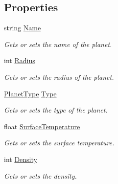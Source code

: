 \subsection*{Properties}
\begin{DoxyCompactItemize}
\item 
string \hyperlink{class_midnight_blue_1_1_planet_metadata_a7afda7361d57bbbf9bb9d6be47167149}{Name}
\begin{DoxyCompactList}\small\item\em Gets or sets the name of the planet. \end{DoxyCompactList}\item 
int \hyperlink{class_midnight_blue_1_1_planet_metadata_a2aa80bee630ca09d10ab12c7734e1ea4}{Radius}
\begin{DoxyCompactList}\small\item\em Gets or sets the radius of the planet. \end{DoxyCompactList}\item 
\hyperlink{namespace_midnight_blue_a4a799009a18b57979628708589ae53e3}{Planet\+Type} \hyperlink{class_midnight_blue_1_1_planet_metadata_a9d8ec38e5924a68970df4795c6185971}{Type}
\begin{DoxyCompactList}\small\item\em Gets or sets the type of the planet. \end{DoxyCompactList}\item 
float \hyperlink{class_midnight_blue_1_1_planet_metadata_a6902b9cd6ac9400696c6aaa74a52821f}{Surface\+Temperature}
\begin{DoxyCompactList}\small\item\em Gets or sets the surface temperature. \end{DoxyCompactList}\item 
int \hyperlink{class_midnight_blue_1_1_planet_metadata_a6f3fe53543f04e24f107c6464b03d885}{Density}
\begin{DoxyCompactList}\small\item\em Gets or sets the density. \end{DoxyCompactList}\item 

\end{DoxyCompactItemize}
